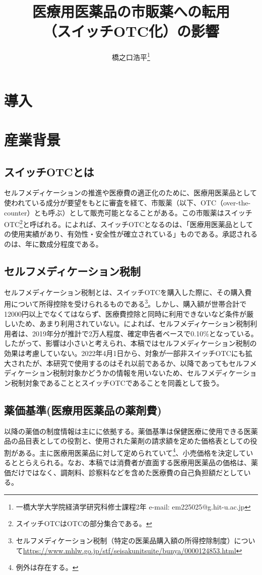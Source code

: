\documentclass[a4paper,11pt,uplatex]{jsarticle}
\title{\vspace{-3cm}医療用医薬品の市販薬への転用\\（スイッチOTC化）の影響}
\author{橋之口浩平\thanks{一橋大学大学院経済学研究科修士課程2年 e-mail: em225025@g.hit-u.ac.jp}}
\date{}
\theoremstyle{definition}
\begin{document}
\maketitle{}
\section{導入}
\section{産業背景}
\subsection{スイッチOTCとは}
セルフメディケーションの推進や医療費の適正化のために、医療用医薬品として使われている成分が要望をもとに審査を経て、市販薬（以下、OTC（over-the-counter）とも呼ぶ）として販売可能となることがある。この市販薬はスイッチOTC\footnote{スイッチOTCはOTCの部分集合である。}と呼ばれる。\cite{jmsi2020}によれば、スイッチOTCとなるのは、「医療用医薬品としての使用実績があり、有効性・安全性が確立されている」ものである。承認されるのは、年に数成分程度である。
\subsection{セルフメディケーション税制}
セルフメディケーション税制とは、スイッチOTCを購入した際に、その購入費用について所得控除を受けられるものである\footnote{セルフメディケーション税制（特定の医薬品購入額の所得控除制度）について\url{https://www.mhlw.go.jp/stf/seisakunitsuite/bunya/0000124853.html}}。しかし、購入額が世帯合計で12000円以上でなくてはならず、医療費控除と同時に利用できないなど条件が厳しいため、あまり利用されていない。\cite{jmsi2021}によれば、セルフメディケーション税制利用者は、2019年分が推計で2万人程度、確定申告者ベースで0.10\%となっている。したがって、影響は小さいと考えられ、本稿ではセルフメディケーション税制の効果は考慮していない。2022年4月1日から、対象が一部非スイッチOTCにも拡大されたが、本研究で使用するのはそれ以前であるか、以降であってもセルフメディケーション税制対象かどうかの情報を用いないため、セルフメディケーション税制対象であることとスイッチOTCであることを同義として扱う。
\subsection{薬価基準(医療用医薬品の薬剤費)}
以降の薬価の制度情報は主に\cite{takahashi}に依拠する。薬価基準は保健医療に使用できる医薬品の品目表としての役割と、使用された薬剤の請求額を定めた価格表としての役割がある。主に医療用医薬品に対して定められていて\footnote{例外は存在する。}、小売価格を決定しているととらえられる。なお、本稿では消費者が直面する医療用医薬品の価格は、薬価だけではなく、調剤料、診察料などを含めた医療費の自己負担額だとしている。
\end{document}
